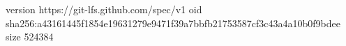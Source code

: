version https://git-lfs.github.com/spec/v1
oid sha256:a43161445f1854e19631279e9471f39a7bbfb21753587cf3c43a4a10b0f9bdee
size 524384
